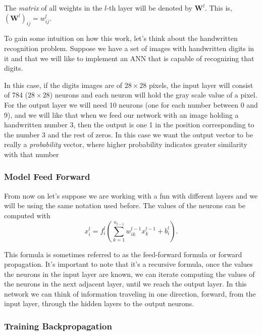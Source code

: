 The \emph{matrix} of all weights in the \(l\)-th layer will be denoted by
\(\mathbf{W}^l\). This is, \({(\mathbf{W}^l)}_{ij} = w_{ij}^ l\).

\begin{exampleBox}
  To gain some intuition on how this work, let's think about the handwritten
  recognition problem. Suppose we have a set of images with handwritten digits
  in it and that we will like to implement an ANN that is capable of
  recognizing that digits.

  In this case, if the digits images are of \(28 \times 28\) pixels, the input
  layer will consist of 784 (\(28 \times 28\)) neurons and each neuron will
  hold the gray scale value of a pixel. For the output layer we will need 10
  neurons (one for each number between 0 and 9), and we will like that when we
  feed our network with an image holding a handwritten number 3, then the
  output is one 1 in the position corresponding to the number 3 and the rest of
  zeros. In this case we want the output vector to be really a
  \emph{probability} vector, where higher probability indicates greater
  similarity with that number
\end{exampleBox}

\subsubsection{Model Feed Forward}\label{subsec:forward}

From now on let's suppose we are working with a \gls{fnn} with different layers
and we will be using the same notation used before. The values of the neurons
can be computed with
\begin{equation}\label{eq:fnn-forward}
  x_i^l = f_i^l \left(
    \sum_{k=1}^{n_{l-1}} w_{ik}^{l-1} x_{k}^{l-1} + b_i^l
  \right).
\end{equation}

This formula is sometimes referred to as the feed-forward formula or forward
propagation. It's important to note that it's a recursive formula, once the
values the neurons in the input layer are known, we can iterate computing the
values of the neurons in the next adjacent layer, until we reach the output
layer. In this network we can think of information traveling in one direction,
forward, from the input layer, through the hidden layers to the output neurons.

\subsubsection{Training Backpropagation}%
\label{sec:backward}


